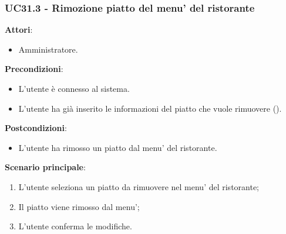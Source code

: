 \subsubsection{UC31.3 - Rimozione piatto del menu' del ristorante}\label{usecase:31_3}
\textbf{Attori}:
\begin{itemize}
    \item Amministratore.
\end{itemize}
\textbf{Precondizioni}:
\begin{itemize}
    \item L'utente è connesso al sistema.
    \item L'utente ha già inserito le informazioni del piatto che vuole rimuovere ().
\end{itemize}
\textbf{Postcondizioni}:
\begin{itemize}
    \item L'utente ha rimosso un piatto dal menu' del ristorante.
\end{itemize}
\textbf{Scenario principale}:
\begin{enumerate}
    \item L'utente seleziona un piatto da rimuovere nel menu' del ristorante;
    \item Il piatto viene rimosso dal menu';
    \item L'utente conferma le modifiche.
\end{enumerate}
\newpage